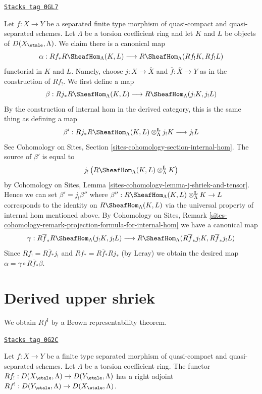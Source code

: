 \begin{remark}
\label{more-etale-remark-projection-formula-for-internal-hom}
\href{https://stacks.math.columbia.edu/tag/0GL7}{\texttt{Stacks tag 0GL7}}

Let $f : X \to Y$ be a separated finite type morphism of quasi-compact
and quasi-separated schemes. Let $\Lambda$ be a torsion coefficient ring
and let $K$ and $L$ be objects of $D(X_\etale, \Lambda)$. We claim
there is a canonical map
$$
\alpha :
Rf_*R\SheafHom_\Lambda(K, L)
\longrightarrow
R\SheafHom_\Lambda(Rf_!K, Rf_!L)
$$
functorial in $K$ and $L$. Namely, choose $j : X \to \overline{X}$ and
$\overline{f} : \overline{X} \to Y$ as in the construction of $Rf_!$.
We first define a map
$$
\beta :
Rj_*R\SheafHom_\Lambda(K, L)
\longrightarrow
R\SheafHom_\Lambda(j_!K, j_!L)
$$
By the construction of internal hom in the derived category, this is
the same thing as defining a map
$$
\beta' :
Rj_*R\SheafHom_\Lambda(K, L) \otimes_\Lambda^\mathbf{L} j_!K
\longrightarrow
j_!L
$$
See Cohomology on Sites, Section \ref{sites-cohomology-section-internal-hom}.
The source of $\beta'$ is equal to
$$
j_!\left(R\SheafHom_\Lambda(K, L) \otimes_\Lambda^\mathbf{L} K\right)
$$
by Cohomology on Sites, Lemma \ref{sites-cohomology-lemma-j-shriek-and-tensor}.
Hence we can set $\beta' = j_!\beta''$ where
$\beta'' : R\SheafHom_\Lambda(K, L) \otimes_\Lambda^\mathbf{L} K \to L$
corresponds to the identity on $R\SheafHom_\Lambda(K, L)$
via the universal property of internal hom mentioned above. By
Cohomology on Sites, Remark
\ref{sites-cohomology-remark-projection-formula-for-internal-hom}
we have a canonical map
$$
\gamma :
R\overline{f}_*R\SheafHom_\Lambda(j_!K, j_!L)
\longrightarrow
R\SheafHom_\Lambda(R\overline{f}_*j_!K, R\overline{f}_*j_!L)
$$
Since $Rf_! = R\overline{f}_*j_!$ and $Rf_* = R\overline{f}_* Rj_*$
(by Leray) we obtain the desired map
$\alpha = \gamma \circ R\overline{f}_*\beta$.
\end{remark}

\section{Derived upper shriek}
\label{more-etale-section-derived-upper-shriek}
We obtain $Rf^!$ by a Brown representability theorem.

\begin{lemma}
\label{more-etale-lemma-upper-shriek-derived}
\href{https://stacks.math.columbia.edu/tag/0G2C}{\texttt{Stacks tag 0G2C}}

Let $f : X \to Y$ be a finite type separated morphism of quasi-compact
and quasi-separated schemes. Let $\Lambda$ be a torsion coefficient ring.
The functor
$Rf_! : D(X_\etale, \Lambda) \to D(Y_\etale, \Lambda)$
has a right adjoint
$Rf^! : D(Y_\etale, \Lambda) \to D(X_\etale, \Lambda)$.
\end{lemma}


